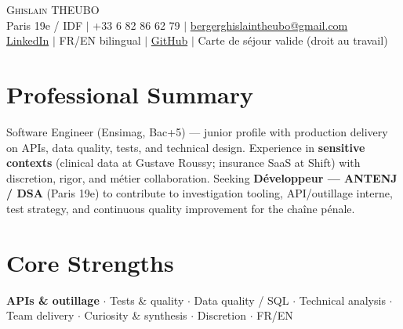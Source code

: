 \documentclass[letterpaper,10.5pt]{article}
\begin{document}
\begin{center}
{\Huge \scshape Ghislain THEUBO} \\ \vspace{2pt}
\small Paris 19e / IDF $|$ +33 6 82 86 62 79 $|$ \href{mailto:bergerghislaintheubo@gmail.com}{bergerghislaintheubo@gmail.com} \\
\href{https://www.linkedin.com/in/berger-ghislain}{LinkedIn} $|$ FR/EN bilingual $|$ \href{https://github.com/Bergerghislain}{GitHub} $|$ Carte de s\'ejour valide (droit au travail)
\end{center}
\vspace{-6pt}
\section{Professional Summary}
\small{Software Engineer (Ensimag, Bac+5) --- junior profile with production delivery on APIs, data quality, tests, and technical design. Experience in \textbf{sensitive contexts} (clinical data at Gustave Roussy; insurance SaaS at Shift) with discretion, rigor, and m\'etier collaboration. Seeking \textbf{D\'eveloppeur --- ANTENJ / DSA} (Paris 19e) to contribute to investigation tooling, API/outillage interne, test strategy, and continuous quality improvement for the cha\^ine p\'enale.}
\section{Core Strengths}
\small{\textbf{APIs \& outillage} $\cdot$ Tests \& quality $\cdot$ Data quality / SQL $\cdot$ Technical analysis $\cdot$ Team delivery $\cdot$ Curiosity \& synthesis $\cdot$ Discretion $\cdot$ FR/EN}
\end{document}
